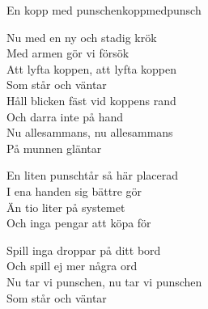 \begin{song}{En kopp med punsch}{enkoppmedpunsch}
\begin{vers}
Nu med en ny och stadig krök\\
Med armen gör vi försök\\
Att lyfta koppen, att lyfta koppen\\
Som står och väntar\\
Håll blicken fäst vid koppens rand\\
Och darra inte på hand\\
Nu allesammans, nu allesammans\\
På munnen gläntar\\
\end{vers}
\begin{vers}
En liten punschtår så här placerad\\
I ena handen sig bättre gör\\
Än tio liter på systemet\\
Och inga pengar att köpa för\\
\end{vers}
\begin{vers}
Spill inga droppar på ditt bord\\
Och spill ej mer några ord\\
Nu tar vi punschen, nu tar vi punschen\\
Som står och väntar\\
\end{vers}
\end{song}
